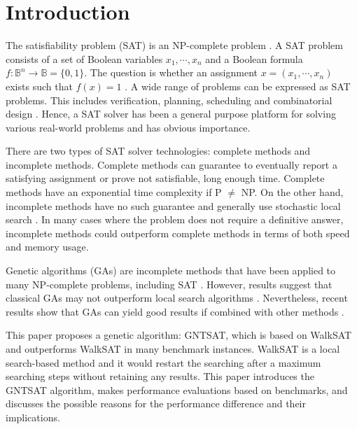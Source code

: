 \section{Introduction}
The satisfiability problem (SAT) is an NP-complete problem
\parencite{cook_1971}. A SAT problem consists of a set of Boolean variables
$x_1, \cdots, x_n$ and a Boolean formula $f: \mathbb{B}^n \rightarrow \mathbb{B}=\{0, 1\}$. The
question is whether an assignment $x=(x_1, \cdots, x_n)$ exists such that
$f(x)=1$ \parencite{gottlieb_marchiori_rossi_2002}. A wide range of problems can be
expressed as SAT problems. This includes verification, planning, scheduling
and combinatorial design \parencite{biere2009handbook}. Hence, a SAT solver has been a
general purpose platform for solving various real-world problems and has
obvious importance.

There are two types of SAT solver technologies: complete methods and
incomplete methods. Complete methods can guarantee to eventually report a
satisfying assignment or prove not satisfiable, long enough time.
Complete methods have an exponential time complexity if P
$\neq$ NP. On the other hand, incomplete methods have no such
guarantee and generally use stochastic local search \parencite{gomes_kautz_sabharwal_selman_2008}. In
many cases where the problem does not require a definitive answer, incomplete
methods could outperform complete methods in terms of both speed and memory
usage.

Genetic algorithms (GAs) are incomplete methods that have been applied to many
NP-complete problems, including SAT \parencite{gottlieb_marchiori_rossi_2002}. However, results
suggest that classical GAs may not outperform local search algorithms
\parencite{de1989using}. Nevertheless, recent results show that GAs can yield
good results if combined with other methods \parencite{gottlieb_marchiori_rossi_2002}.

This paper proposes a genetic algorithm: GNTSAT, which is based on WalkSAT
\parencite{selman1994noise} and outperforms WalkSAT in many benchmark instances. WalkSAT is a local search-based method and it would restart the searching after a maximum searching steps without retaining any results.
This paper introduces the GNTSAT algorithm, makes performance evaluations
based on benchmarks, and discusses the possible reasons for the performance
difference and their implications.
